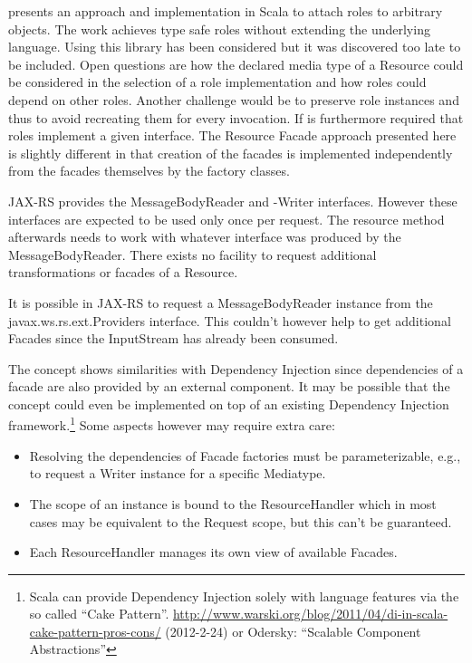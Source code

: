 \documentclass[11pt,a4paper,headsepline,twoside]{scrartcl}		%
\newcommand{\citeurl}[2]{\url{#1} (#2)}
\begin{document}
\cite{Pradel2008a} presents an approach and implementation in Scala to attach
roles to arbitrary objects. The work achieves type safe roles without extending
the underlying language. Using this library has been considered but it was
discovered too late to be included. Open questions are how the declared media
type of a Resource could be considered in the selection of a role implementation
and how roles could depend on other roles. Another challenge would be to
preserve role instances and thus to avoid recreating them for every
invocation. If is furthermore required that roles implement a given
interface. The Resource Facade approach presented here is slightly different in
that creation of the facades is implemented independently from the facades
themselves by the factory classes.

JAX-RS provides the MessageBodyReader and -Writer interfaces. However these
interfaces are expected to be used only once per request. The resource method
afterwards needs to work with whatever interface was produced by the
MessageBodyReader. There exists no facility to request additional
transformations or facades of a Resource.

It is possible in JAX-RS to request a MessageBodyReader instance from the
javax.ws.rs.ext.Providers interface. This couldn't however help to get
additional Facades since the InputStream has already been consumed.

The concept shows similarities with Dependency Injection since dependencies of a
facade are also provided by an external component. It may be possible that the
concept could even be implemented on top of an existing Dependency Injection
framework.\footnote{Scala can provide Dependency Injection solely with language
  features via the so called ``Cake
  Pattern''. \citeurl{http://www.warski.org/blog/2011/04/di-in-scala-cake-pattern-pros-cons/}{2012-2-24}
  or Odersky: ``Scalable Component Abstractions''} Some aspects however may
require extra care:

\begin{itemize}
\item Resolving the dependencies of Facade factories must be parameterizable,
  e.g., to request a Writer instance for a specific Mediatype.
\item The scope of an instance is bound to the ResourceHandler which in most
  cases may be equivalent to the Request scope, but this can't be guaranteed.
\item Each ResourceHandler manages its own view of available Facades.
\end{itemize}
\end{document}
